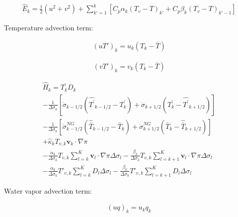 \begin{eqnarray}
 \hat{E}_k    
  = \frac{1}{2} ( u^2 + v^2 )
    +  \sum_{k'=1}^{k} \left[  C_p \alpha_k ( T_v - T )_{k'}
                              + C_p \beta_k ( T_v - T )_{k'-1} \right]
\end{eqnarray}

Temperature advection term:

\begin{eqnarray}
 (u T')_k  = u_k (T_k - \bar{T} )
\end{eqnarray}

\begin{eqnarray}
 (v T')_k  = v_k (T_k - \bar{T} )
\end{eqnarray}

\begin{eqnarray}
 \hat{H}_k  =  T_{k}^{\prime} D_{k}  \\
         - \frac{1}{\Delta \sigma_{k}}
             [   \dot{\sigma}_{k-1/2} ( \hat{T^{\prime}}_{k-1/2}
                                         - T^{\prime}_{k}   )
               + \dot{\sigma}_{k+1/2} ( T^{\prime}_{k}  
                                         - \hat{T^{\prime}}_{k+1/2} ) ]
                \\
         - \frac{1}{\Delta \sigma_{k}}
             [   \dot{\sigma}^{NG}_{k-1/2} ( \hat{\bar{T}}_{k-1/2}
                                         - \bar{T}_{k}   )
               + \dot{\sigma}^{NG}_{k+1/2} ( \bar{T}_{k}  
                                         - \hat{\bar{T}}_{k+1/2} ) ]
                \\
         + \hat{\kappa}_{k} T_{v,k} \mathbf{v}_{k} \cdot \nabla \pi
                \\
         - \frac{\alpha_{k}}{\Delta \sigma_{k} } T_{v,k}
             \sum_{l=k}^{K} \mathbf{v}_{l} \cdot \nabla \pi
               \Delta \sigma_{l}
           - \frac{\beta_{k}}{\Delta \sigma_{k} } T_{v,k}
             \sum_{l=k+1}^{K} \mathbf{v}_{l} \cdot \nabla \pi
               \Delta \sigma_{l}
                \\
         - \frac{\alpha_{k}}{\Delta \sigma_{k} } T'_{v,k}
             \sum_{l=k}^{K} D_l  \Delta \sigma_{l}
           - \frac{\beta_{k}}{\Delta \sigma_{k} } T'_{v,k}
             \sum_{l=k+1}^{K} D_l  \Delta \sigma_{l}
\end{eqnarray}

Water vapor advection term:

\begin{eqnarray}
 (u q)_k  = u_k q_k
\end{eqnarray}

